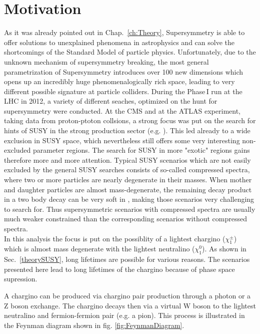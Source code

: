 \section{Motivation}
\label{sec:Motivation}
As it was already pointed out in Chap.~\ref{ch:Theory}, Supersymmetry is able to offer solutions to unexplained phenomena in astrophysics and can solve the shortcomings of the Standard Model of particle physics.
Unfortunately, due to the unknown mechanism of supersymmetry breaking, the most general parametrization of Supersymmetry introduces over 100 new dimensions which opens up an incredibly huge phenomenalogically rich space, 
leading to very different possible signature at particle colliders. 
During the Phase\,I run at the LHC in 2012, a variety of different seaches, optimized on the hunt for supersymmetry were conducted.
At the CMS and at the ATLAS experiment, taking data from proton-ptoton collsions, a strong focus was put on the search for hints of SUSY in the strong production sector (e.g. \cite{bib:CMS:RA2_8TeV,bib:CMS:MT2_8TeV,bib:ATLAS:JetPlusMET_8TeV}).
This led already to a wide exclusion in SUSY space, which nevertheless still offers some very interesting non-excluded parameter regions.
The search for SUSY in more "exotic" regions gains therefore more and more attention. 
Typical SUSY scenarios which are not easily excluded by the general SUSY searches consists of so-called compressed spectra, where two or more particles are nearly degenerate in their masses.
When mother and daughter particles are almost mass-degenerate, the remaining decay product in a two body decay can be very soft in \pt, making those scenarios very challenging to search for.
Thus supersymmetric scenarios with compressed spectra are usually much weaker constrained than the corresponding scenarios without compressed spectra.\\

In this analysis the focus is put on the possiblity of a lightest chargino ($\chi^{\pm}_1$) which is almost mass degenerate with the lightest neutralino ($\chi^{0}_1$).
As shown in Sec.~\ref{theorySUSY}, long lifetimes are possible for various reasons.
The scenarios presented here lead to long lifetimes of the chargino because of phase space supression.

A chargino can be produced via chargino pair production through a photon or a Z boson exchange. The chargino decays then via a virtual W boson to the lightest neutralino and fermion-fermion pair (e.g. a pion).
This process is illustrated in the Feynman diagram shown in fig. \ref{fig:FeynmanDiagram}.

